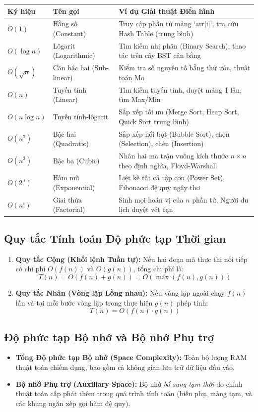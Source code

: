\documentclass[11pt,a4paper]{article}
\begin{document}
\begin{center}
\begin{tabularx}{\textwidth}{l l X}
\toprule
\textbf{Ký hiệu} & \textbf{Tên gọi} & \textbf{Ví dụ Giải thuật Điển hình} \\
\midrule
$O(1)$ & Hằng số (Constant) & Truy cập phần tử mảng `arr[i]`, tra cứu Hash Table (trung bình) \\
$O(\log n)$ & Lôgarit (Logarithmic) & Tìm kiếm nhị phân (Binary Search), thao tác trên cây BST cân bằng \\
$O(\sqrt{n})$ & Căn bậc hai (Sub-linear) & Kiểm tra số nguyên tố bằng thử ước, thuật toán Mo \\
$O(n)$ & Tuyến tính (Linear) & Tìm kiếm tuyến tính, duyệt mảng 1 lần, tìm Max/Min \\
$O(n \log n)$ & Tuyến tính-lôgarit & Sắp xếp tối ưu (Merge Sort, Heap Sort, Quick Sort trung bình) \\
$O(n^2)$ & Bậc hai (Quadratic) & Sắp xếp nổi bọt (Bubble Sort), chọn (Selection), chèn (Insertion) \\
$O(n^3)$ & Bậc ba (Cubic) & Nhân hai ma trận vuông kích thước $n \times n$ theo định nghĩa, Floyd-Warshall \\
$O(2^n)$ & Hàm mũ (Exponential) & Liệt kê tất cả tập con (Power Set), Fibonacci đệ quy ngây thơ \\
$O(n!)$ & Giai thừa (Factorial) & Sinh mọi hoán vị của $n$ phần tử, Người du lịch duyệt vét cạn \\
\bottomrule
\end{tabularx}
\end{center}

\subsection{Quy tắc Tính toán Độ phức tạp Thời gian}
\begin{enumerate}[leftmargin=2em]
    \item \textbf{Quy tắc Cộng (Khối lệnh Tuần tự):} Nếu hai đoạn mã thực thi nối tiếp có chi phí $O(f(n))$ và $O(g(n))$, tổng chi phí là:
    \[
    T(n) = O(f(n) + g(n)) = O(\max(f(n), g(n)))
    \]
    \item \textbf{Quy tắc Nhân (Vòng lặp Lồng nhau):} Nếu vòng lặp ngoài chạy $f(n)$ lần và tại mỗi bước vòng lặp trong thực hiện $g(n)$ phép tính:
    \[
    T(n) = O(f(n) \cdot g(n))
    \]
\end{enumerate}

\subsection{Độ phức tạp Bộ nhớ và Bộ nhớ Phụ trợ}
\begin{itemize}[itemsep=2pt]
    \item \textbf{Tổng Độ phức tạp Bộ nhớ (Space Complexity):} Toàn bộ lượng RAM thuật toán chiếm dụng, bao gồm cả không gian lưu trữ dữ liệu đầu vào.
    \item \textbf{Bộ nhớ Phụ trợ (Auxiliary Space):} Bộ nhớ \emph{bổ sung tạm thời} do chính thuật toán cấp phát thêm trong quá trình tính toán (biến phụ, mảng tạm, và các khung ngăn xếp gọi hàm đệ quy).
\end{itemize}
\end{document}
